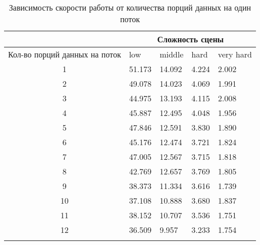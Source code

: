\begin{center}
\begin{longtable}{|c|p{2cm}|p{2cm}|p{2cm}|p{2cm}|}
\hline & \multicolumn{4}{c|}{Сложность сцены} \\ 
\hline Кол-во порций данных на поток & low & middle & hard &  very hard\\ 
\hline 1 &  51.173 & 14.092 & 4.224 & 2.002 \\ 
\hline 2 &  49.078 & 14.023 & 4.069 & 1.991 \\ 
\hline 3 &  44.975 & 13.193 & 4.115 & 2.008 \\ 
\hline 4 &  45.887 & 12.495 & 4.048 & 1.956 \\ 
\hline 5 &  47.846 & 12.591 & 3.830 & 1.890 \\ 
\hline 6 &  45.176 & 12.474 & 3.721 & 1.824 \\ 
\hline 7 &  47.005 & 12.567 & 3.715 & 1.818 \\ 
\hline 8 &  42.769 & 12.657 & 3.769 & 1.805 \\ 
\hline 9 &  38.373 & 11.334 & 3.616 & 1.739 \\ 
\hline 10 &  37.108 & 10.888 & 3.680 & 1.837 \\ 
\hline 11 &  38.152 & 10.707 & 3.536 & 1.751 \\ 
\hline 12 &  36.509 & 9.957 & 3.233 & 1.754 \\ 
\hline
\caption{Зависимость скорости работы от количества порций данных на один поток}\label{tab:performance_gs}\end{longtable}
\end{center}

